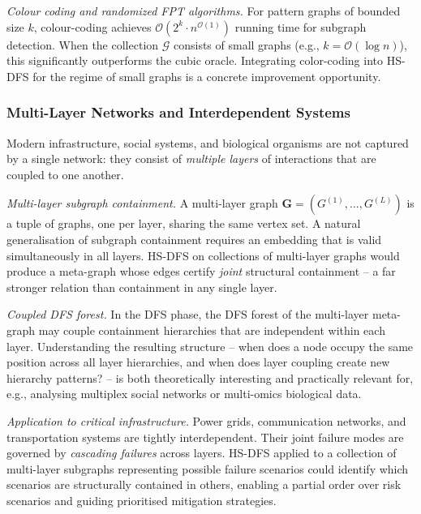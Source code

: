 ﻿\documentclass[12pt,a4paper]{article}
\theoremstyle{plain}
\theoremstyle{definition}
\theoremstyle{remark}
\begin{document}
	\emph{Colour coding and randomized FPT algorithms.}  For pattern graphs of
	bounded size $k$, colour-coding \cite{cormen2009} achieves
	$\mathcal{O}(2^k \cdot n^{\mathcal{O}(1)})$ running time for subgraph
	detection.  When the collection $\mathcal{G}$ consists of small graphs
	(e.g., $k = \mathcal{O}(\log n)$), this significantly outperforms the
	cubic oracle.  Integrating color-coding into HS-DFS for the regime of
	small graphs is a concrete improvement opportunity.

	\subsubsection*{Multi-Layer Networks and Interdependent Systems}

	Modern infrastructure, social systems, and biological organisms are not
	captured by a single network: they consist of \emph{multiple layers} of
	interactions that are coupled to one another.

	\emph{Multi-layer subgraph containment.}  A multi-layer graph
	$\mathbf{G} = (G^{(1)}, \ldots, G^{(L)})$ is a tuple of graphs,
	one per layer, sharing the same vertex set.  A natural generalisation
	of subgraph containment requires an embedding that is valid simultaneously
	in all layers.  HS-DFS on collections of multi-layer graphs would produce
	a meta-graph whose edges certify \emph{joint} structural containment --
	a far stronger relation than containment in any single layer.

	\emph{Coupled DFS forest.}  In the DFS phase, the DFS forest of the
	multi-layer meta-graph may couple containment hierarchies that are
	independent within each layer.  Understanding the resulting structure --
	when does a node occupy the same position across all layer hierarchies,
	and when does layer coupling create new hierarchy patterns? -- is both
	theoretically interesting and practically relevant for, e.g., analysing
	multiplex social networks or multi-omics biological data.

	\emph{Application to critical infrastructure.}  Power grids, communication
	networks, and transportation systems are tightly interdependent.  Their
	joint failure modes are governed by \emph{cascading failures} across layers.
	HS-DFS applied to a collection of multi-layer subgraphs representing possible
	failure scenarios could identify which scenarios are structurally contained
	in others, enabling a partial order over risk scenarios and guiding
	prioritised mitigation strategies.
\end{document}

